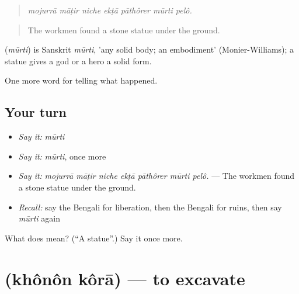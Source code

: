 \begin{quote}
      
\end{quote}

\begin{quote}
\emph{mojurrā māṭir niche ekṭā pāthôrer mūrti pelô.}
\end{quote}

\begin{quote}
The workmen found a stone statue under the ground.
\end{quote}

\begin{cousinweb}
\textbf{} (\emph{mūrti}) is Sanskrit \emph{mūrti}, 'any solid body; an embodiment' (Monier-Williams); a statue gives a god or a hero a solid form.
\end{cousinweb}

\begin{grammarlens}[title={What you've built}]
One more word for telling what happened.
\end{grammarlens}

\subsection*{Your turn}
\begin{itemize}
\raggedright
  \item \emph{Say it:} \emph{mūrti}
  \item \emph{Say it:} \emph{mūrti}, once more
  \item \emph{Say it:} \emph{mojurrā māṭir niche ekṭā pāthôrer mūrti pelô.} — The workmen found a stone statue under the ground.
  \item \emph{Recall:} say the Bengali for liberation, then the Bengali for ruins, then say \emph{mūrti} again
\end{itemize}

\begin{tcolorbox}[breakable,colback=teal!4,colframe=teal!35!black,title={Before you move on}]
What does  mean? (\textquotedblleft{}A statue\textquotedblright{}.) Say it once more.
\end{tcolorbox}
\section[\texorpdfstring{\bn{খনন} \bn{করা} (khônôn kôrā)}{খনন করা (khônôn kôrā)}]{  (khônôn kôrā) — to excavate}

